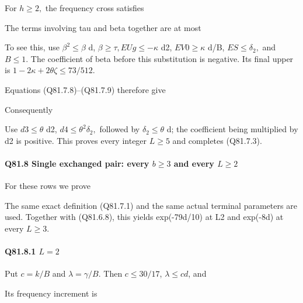 For \(h\ge 2,\allowbreak \) the frequency cross satisfies


The terms involving tau and beta together are at most


To see this, use \(\beta^2\le \beta\) d, \(\beta\ge \tau,\allowbreak  EUg\le -\kappa\) d2,
\(EV0\ge \kappa\) d/B, \(ES\le \delta_2,\allowbreak \) and \(B\le 1.\) The coefficient of beta
before this substitution is negative. Its final upper is
\(1-2\kappa+2\theta\zeta\le73/512\).

Equations (Q81.7.8)--(Q81.7.9) therefore give


Consequently


Use \(d3\le \theta\) d2, \(d4\le \theta^2\delta_2,\allowbreak \) followed by \(\delta_2\le \theta\) d;
the coefficient being multiplied by d2 is positive. This proves
every integer \(L\ge 5\) and completes (Q81.7.3).

\paragraph{Q81.8 Single exchanged pair: every \(b\ge 3\) and every \(L\ge 2\)}

For these rows we prove


The same exact definition (Q81.7.1) and the same actual terminal parameters
are used. Together with (Q81.6.8), this yields exp(-79d/10) at L2 and exp(-8d)
at every \(L\ge 3.\)

\paragraph{Q81.8.1 \(L=2\)}

Put \(c=k/B\) and \(\lambda=\gamma/B.\) Then
\(c\le30/17\), \(\lambda\le cd\), and


Its frequency increment is

